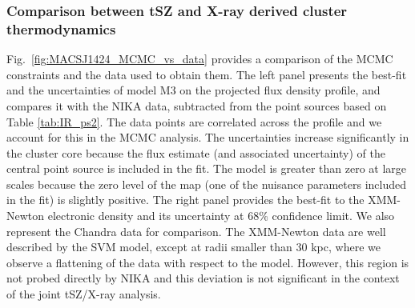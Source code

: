 \documentclass[twocolumn,traditabstract]{aa}
\begin{document}
\subsubsection{Comparison between tSZ and X-ray derived cluster thermodynamics}
Fig.~\ref{fig:MACSJ1424_MCMC_vs_data} provides a comparison of the MCMC constraints and the data used to obtain them. The left panel presents the best-fit and the uncertainties of model M3 on the projected flux density profile, and compares it with the NIKA data, subtracted from the point sources based on Table \ref{tab:IR_ps2}. The data points are correlated across the profile and we account for this in the MCMC analysis. The uncertainties increase significantly in the cluster core because the flux estimate (and associated uncertainty) of the central point source is included in the fit. The model is greater than zero at large scales because the zero level of the map (one of the nuisance parameters included in the fit) is slightly positive. The right panel provides the best-fit to the XMM-Newton electronic density and its uncertainty at 68\% confidence limit. We also represent the Chandra data for comparison. The XMM-Newton data are well described by the SVM model, except at radii smaller than 30 kpc, where we observe a flattening of the data with respect to the model. However, this region is not probed directly by NIKA and this deviation is not significant in the context of the joint tSZ/X-ray analysis.
\end{document}
